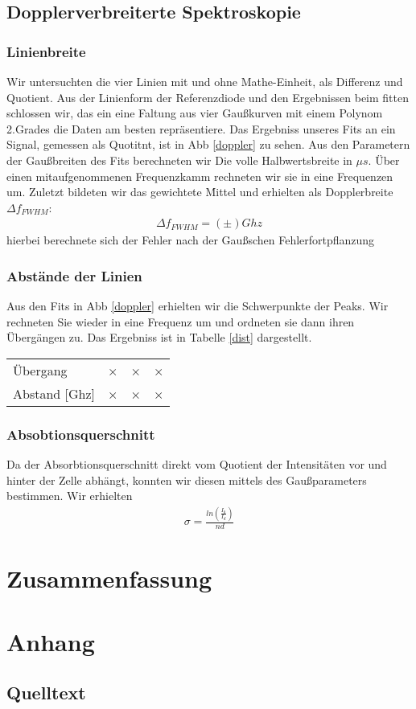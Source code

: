 \documentclass[12pt]{article}
\begin{document}
\subsection{Dopplerverbreiterte Spektroskopie}
\subsubsection{Linienbreite}
Wir untersuchten die vier Linien mit und ohne Mathe-Einheit, als Differenz und Quotient. Aus der Linienform der Referenzdiode und den Ergebnissen beim fitten schlossen wir, das ein eine Faltung aus vier Gaußkurven mit einem Polynom 2.Grades die Daten am besten repräsentiere. Das Ergebniss unseres Fits an ein Signal, gemessen als Quotitnt, ist in Abb \ref{doppler} zu sehen. Aus den Parametern der Gaußbreiten des Fits berechneten wir Die volle Halbwertsbreite in $\mu s$. Über einen mitaufgenommenen Frequenzkamm rechneten wir sie in eine Frequenzen um. Zuletzt bildeten wir das gewichtete Ḿittel und erhielten als Dopplerbreite $\Delta f_{FWHM}$:
\begin{align*}
 \Delta f_{FWHM} = (\pm) Ghz 
\end{align*}
hierbei berechnete sich der Fehler nach der Gaußschen Fehlerfortpflanzung
\subsubsection{Abstände der Linien}
Aus den Fits in Abb \ref{doppler} erhielten wir die Schwerpunkte der Peaks. Wir rechneten Sie wieder in eine Frequenz um und ordneten sie dann ihren Übergängen zu. Das Ergebniss ist in Tabelle \ref{dist} dargestellt.
\begin{center}
\begin{tabular}{|l|lll|}
\label{dist}
\hline
Übergang & × & × & ×\\
Abstand [Ghz] & × & × & ×
\hline
\end{tabular}
\end{center}
\subsubsection{Absobtionsquerschnitt}
Da der Absorbtionsquerschnitt direkt vom Quotient der Intensitäten vor und hinter der Zelle abhängt, konnten wir diesen mittels des Gaußparameters bestimmen.
Wir erhielten
\begin{align*}
 \sigma = \frac{ln \left( \frac{I_0}{I_d} \right) }{nd}
\end{align*}
\section{Zusammenfassung}
\section{Anhang}


\subsection{Quelltext}

%
\end{document}
